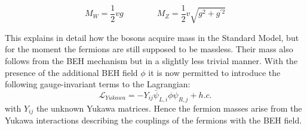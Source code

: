 \begin{equation}\label{eq::VectorBosonMasses}
 M_W = \frac{1}{2} v g \qquad \qquad M_Z = \frac{1}{2} v \sqrt{g^2 + g^{'2}}
\end{equation}

This explains in detail how the bosons acquire mass in the Standard Model, but for the moment the fermions are still supposed to be massless. Their mass also follows from the BEH mechanism but in a slightly less trivial manner. %
With the presence of the additional BEH field $\phi$ it is now permitted to introduce the following gauge-invariant terms to the Lagrangian:
\begin{equation}
 \mathcal{L}_{Yukawa} = - Y_{ij} \bar{\psi}_{L,i} \phi \psi_{R,j} + h.c. 
\end{equation}
with $Y_{ij}$ the unknown Yukawa matrices. Hence the fermion masses arise from the Yukawa interactions describing the couplings of the fermions with the BEH field.

